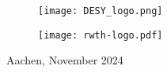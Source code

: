 \begin{titlepage}
\begin{center}
        \vfill
        
        \begin{figure}[h]
            \begin{minipage}{0.3\textwidth}
                \flushleft
                \texttt{[image: DESY\_logo.png]}
            \end{minipage}
            \hfill
            \begin{minipage}{0.3\textwidth}
                \flushright
                \texttt{[image: rwth-logo.pdf]}
            \end{minipage}
        \end{figure}
        
        \vspace{0.5cm}
        
        Aachen, November 2024
            
    \end{center}
\end{titlepage}